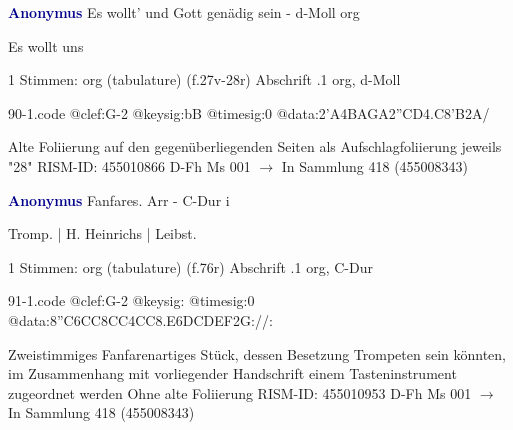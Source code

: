 \documentclass[twocolumn]{book}
\begin{document}
\newline \par \vspace{7pt} \textcolor{darkblue}{\textbf{Anonymus  }}
\newline Es wollt' und Gott genädig sein - d-Moll
\newline org
\newline \begin{itshape}[f.27v, at left:] Es wollt uns\end{itshape} 
\newline \textcolor{darkblue}{}  1 Stimmen: org (tabulature)  (f.27v-28r)
\newline Abschrift
.1  org, d-Moll  
\begin{filecontents*}{90-1.code}
@clef:G-2
@keysig:bB
@timesig:0
@data:2'A4BAGA2''CD4.C8'B2A/
\end{filecontents*}
\newline
%
\newline Alte Foliierung auf den gegenüberliegenden Seiten als Aufschlagfoliierung jeweils "28"
\newline RISM-ID: 455010866
\newline D-Fh  Ms 001
\newline $\rightarrow$ In Sammlung 418 (455008343)
      
\newline \par \vspace{7pt} \textcolor{darkblue}{\textbf{Anonymus  }}
\newline Fanfares. Arr - C-Dur
\newline i
\newline \begin{itshape}[f.76r, at left:] Tromp. | H. Heinrichs | Leibst.\end{itshape} 
\newline \textcolor{darkblue}{}  1 Stimmen: org (tabulature)  (f.76r)
\newline Abschrift
.1  org, C-Dur  
\begin{filecontents*}{91-1.code}
@clef:G-2
@keysig:
@timesig:0
@data:{8''C6CC8CC}4CC{8.E6D}{CDEF}2G://:
\end{filecontents*}
\newline
%
\newline Zweistimmiges Fanfarenartiges Stück, dessen Besetzung Trompeten sein könnten, im Zusammenhang mit vorliegender Handschrift einem Tasteninstrument zugeordnet werden
\newline Ohne alte Foliierung
\newline RISM-ID: 455010953
\newline D-Fh  Ms 001
\newline $\rightarrow$ In Sammlung 418 (455008343)
      
\end{document}
